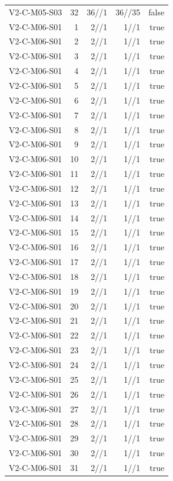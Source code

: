 {\begin{longtable}{lrrrr}
V2-C-M05-S03 & 32 & 36//1 & 36//35 & false \\
V2-C-M06-S01 & 1 & 2//1 & 1//1 & true \\
V2-C-M06-S01 & 2 & 2//1 & 1//1 & true \\
V2-C-M06-S01 & 3 & 2//1 & 1//1 & true \\
V2-C-M06-S01 & 4 & 2//1 & 1//1 & true \\
V2-C-M06-S01 & 5 & 2//1 & 1//1 & true \\
V2-C-M06-S01 & 6 & 2//1 & 1//1 & true \\
V2-C-M06-S01 & 7 & 2//1 & 1//1 & true \\
V2-C-M06-S01 & 8 & 2//1 & 1//1 & true \\
V2-C-M06-S01 & 9 & 2//1 & 1//1 & true \\
V2-C-M06-S01 & 10 & 2//1 & 1//1 & true \\
V2-C-M06-S01 & 11 & 2//1 & 1//1 & true \\
V2-C-M06-S01 & 12 & 2//1 & 1//1 & true \\
V2-C-M06-S01 & 13 & 2//1 & 1//1 & true \\
V2-C-M06-S01 & 14 & 2//1 & 1//1 & true \\
V2-C-M06-S01 & 15 & 2//1 & 1//1 & true \\
V2-C-M06-S01 & 16 & 2//1 & 1//1 & true \\
V2-C-M06-S01 & 17 & 2//1 & 1//1 & true \\
V2-C-M06-S01 & 18 & 2//1 & 1//1 & true \\
V2-C-M06-S01 & 19 & 2//1 & 1//1 & true \\
V2-C-M06-S01 & 20 & 2//1 & 1//1 & true \\
V2-C-M06-S01 & 21 & 2//1 & 1//1 & true \\
V2-C-M06-S01 & 22 & 2//1 & 1//1 & true \\
V2-C-M06-S01 & 23 & 2//1 & 1//1 & true \\
V2-C-M06-S01 & 24 & 2//1 & 1//1 & true \\
V2-C-M06-S01 & 25 & 2//1 & 1//1 & true \\
V2-C-M06-S01 & 26 & 2//1 & 1//1 & true \\
V2-C-M06-S01 & 27 & 2//1 & 1//1 & true \\
V2-C-M06-S01 & 28 & 2//1 & 1//1 & true \\
V2-C-M06-S01 & 29 & 2//1 & 1//1 & true \\
V2-C-M06-S01 & 30 & 2//1 & 1//1 & true \\
V2-C-M06-S01 & 31 & 2//1 & 1//1 & true \\

\end{longtable}}
